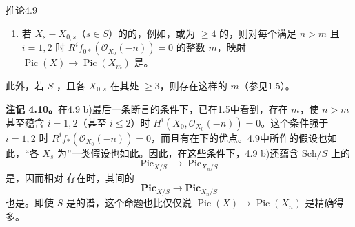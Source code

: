 \begin{SGAresult}{推论}{4.9}
\begin{enumerate}
\item[b)] 若 $X_s-X_{0,s}$（$s\in S$）的的，例如，或为 $\geq4$ 的，则对每个满足 $n>m$ 且 $i=1,2$ 时 $R^if_{0*}(\mathcal O_{X_0}(-n))=0$ 的整数 $m$，映射 $\operatorname{Pic}(X)\to\operatorname{Pic}(X_m)$ 是。
\end{enumerate}
此外，若 $S$ ，且各 $X_{0,s}$ 在其处 $\geq3$，则存在这样的 $m$（参见1.5）。
\end{SGAresult}
\textbf{注记 4.10。}在4.9 b)最后一条断言的条件下，已在1.5中看到，存在 $m$，使 $n>m$ 甚至蕴含 $i=1,2$（甚至 $i\leq2$）时 $H^i(X_0,\mathcal O_{X_0}(-n))=0$。这个条件强于 $i=1,2$ 时 $R^if_*(\mathcal O_{X_0}(-n))=0$，而且有在下的优点。4.9中所作的假设也如此，“各 $X_s$ 为”一类假设也如此。因此，在这些条件下，4.9 b)还蕴含 $\mathrm{Sch}/S$ 上的
\[
 \operatorname{Pic}_{X/S}\longrightarrow\operatorname{Pic}_{X_n/S}
\]
是，因而相对 存在时，其间的
\[
 \mathbf{Pic}_{X/S}\longrightarrow\mathbf{Pic}_{X_n/S}
\]
也是。即使 $S$ 是的谱，这个命题也比仅仅说 $\operatorname{Pic}(X)\to\operatorname{Pic}(X_n)$ 是精确得多。

